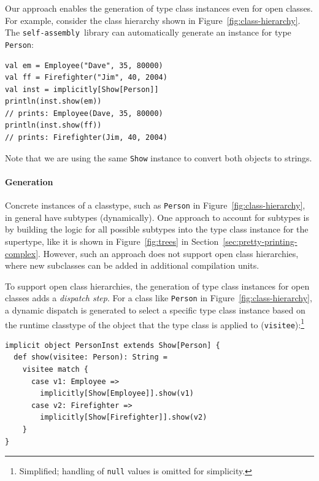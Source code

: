 \documentclass[preprint,nocopyrightspace]{sigplanconf}
\newcommand{\selfassembly}{\texttt{self-assembly~}}
\begin{document}
Our approach enables the generation of type class instances even for open
classes. For example, consider the class hierarchy shown in
Figure~\ref{fig:class-hierarchy}. The \selfassembly library can automatically generate
an instance for type \verb|Person|:

\begin{lstlisting}
val em = Employee("Dave", 35, 80000)
val ff = Firefighter("Jim", 40, 2004)
val inst = implicitly[Show[Person]]
println(inst.show(em))
// prints: Employee(Dave, 35, 80000)
println(inst.show(ff))
// prints: Firefighter(Jim, 40, 2004)
\end{lstlisting}
\noindent
Note that we are using the same \verb|Show| instance to convert both objects
to strings.

\paragraph{Generation}

Concrete instances of a classtype, such as \verb|Person| in
Figure~\ref{fig:class-hierarchy}, in general have subtypes (dynamically). One approach to
account for subtypes is by building the logic for all possible subtypes into
the type class instance for the supertype, like it is shown in
Figure~\ref{fig:trees} in Section~\ref{sec:pretty-printing-complex}.
However, such an approach does not support open class hierarchies, where new subclasses can be
added in additional compilation units.

To support open class hierarchies, the generation of type class instances for
open classes adds a {\em dispatch step}. For a class like \verb|Person| in
Figure~\ref{fig:class-hierarchy}, a dynamic dispatch is generated to select a
specific type class instance based on the runtime classtype of the object that the type
class is applied to (\verb|visitee|):\footnote{Simplified; handling of \texttt{null} values is omitted for simplicity.}

\begin{lstlisting}
implicit object PersonInst extends Show[Person] {
  def show(visitee: Person): String =
    visitee match {
      case v1: Employee =>
        implicitly[Show[Employee]].show(v1)
      case v2: Firefighter =>
        implicitly[Show[Firefighter]].show(v2)
    }
}
\end{lstlisting}

\end{document}
